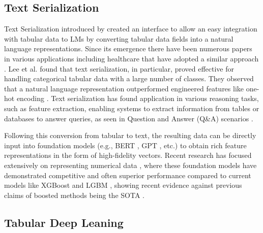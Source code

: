 \documentclass{article}
\theoremstyle{plain}
\theoremstyle{definition}
\theoremstyle{remark}
\begin{document}
\subsection{Text Serialization}

Text Serialization introduced by \cite{hegselmann2023tabllm, dinh2022lift,gidroltext, jaitly2023better, lee2024enhancing} created an interface to allow an easy integration with tabular data to LMs by converting tabular data fields into a natural language representations. Since its emergence there have been numerous papers in various applications including healthcare that have adopted a similar approach \cite{chen2024multimodal,kim2024health,hegselmann2024data,belyaeva2023multimodal}. Lee et al. found that text serialization, in particular, proved effective for handling categorical tabular data with a large number of classes. They observed that a natural language representation outperformed engineered features like one-hot encoding \citep{lee2024multimodal}. Text serialization has found application in various reasoning tasks, such as feature extraction, enabling systems to extract information from tables or databases to answer queries, as seen in Question and Answer (Q\&A) scenarios \cite{min2024exploring, sui2024table, li2024can}.

Following this conversion from tabular to text, the resulting data can be directly input into foundation models (e.g., BERT \cite{devlin2018bert}, GPT \cite{brown2020language}, etc.) to obtain rich feature representations in the form of high-fidelity vectors. Recent research has focused extensively on representing numerical data \cite{gorishniy2022embeddings, golkar2023xval}, where these foundation models have demonstrated competitive and often superior performance compared to current models like XGBoost \cite{chen2016xgboost} and LGBM \cite{ke2017lightgbm}, showing recent evidence against previous claims of boosted methods being the SOTA \cite{grinsztajn2022tree}.

\subsection{Tabular Deep Leaning}
\end{document}
